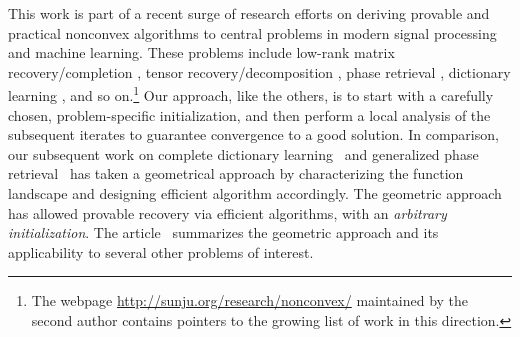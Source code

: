 \documentclass[11pt, journal, final]{IEEEtran}
\numberwithin{equation}{section}
\begin{document}
{This work is part of a recent surge of research efforts on deriving provable and practical nonconvex algorithms to central problems in modern signal processing and machine learning. These problems include low-rank matrix recovery/completion \cite{jain2013low,hardt2013provable,hardt2014fast,hardt2014understanding,jain2014fast,netrapalli2014non,zheng2015convergent,tu2015low,chen2015fast}, tensor recovery/decomposition \cite{jain2014provable,anandkumar2014guaranteed,anandkumar2014analyzing,anandkumar2015tensor,ge2015escaping}, phase retrieval \cite{netrapalli2013phase,candes2014wirtinger,chen2015solving,sun2016geometric}, dictionary learning \cite{arora2013new,agarwal2013learning,agarwal2013exact,arora2014more,arora2015simple,sun2015complete}, and so on.\footnote{The webpage \url{http://sunju.org/research/nonconvex/} maintained by the second author contains pointers to the growing list of work in this direction. } Our approach, like the others, is to start with a carefully chosen, problem-specific initialization, and then perform a local analysis of the subsequent iterates to guarantee convergence to a good solution. In comparison, our subsequent work on complete dictionary learning~\cite{sun2015complete} and generalized phase retrieval~\cite{sun2016geometric} has taken a geometrical approach by characterizing the function landscape and designing efficient algorithm accordingly. The geometric approach has allowed provable recovery via efficient algorithms, with an \emph{arbitrary initialization}. The article~\cite{sun2015nonconvex} summarizes the geometric approach and its applicability to several other problems of interest.

}
\end{document}
